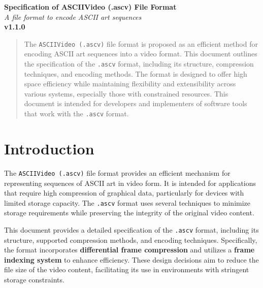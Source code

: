 \documentclass{article}
\begin{document}
\begin{titlepage}
   \begin{center}
       \vspace*{1cm}
       \textbf{Specification of ASCIIVideo (.ascv) File Format} \\
        \textit{A file format to encode ASCII art sequences} \\
        \vspace{0.5cm}
       \textbf{v1.1.0} \\
        \vspace{2cm}
       \vfill
   \end{center}
\end{titlepage}

\begin{abstract}
The \texttt{ASCIIVideo (.ascv)} file format is proposed as an efficient method for encoding ASCII art sequences into a video format. This document outlines the specification of the \texttt{.ascv} format, including its structure, compression techniques, and encoding methods. The format is designed to offer high space efficiency while maintaining flexibility and extensibility across various systems, especially those with constrained resources. This document is intended for developers and implementers of software tools that work with the \texttt{.ascv} format.
\end{abstract}
\newpage

\section{Introduction}

The \texttt{ASCIIVideo (.ascv)} file format provides an efficient mechanism for representing sequences of ASCII art \cite{enwiki:1271222132} in video form. It is intended for applications that require high compression of graphical data, particularly for devices with limited storage capacity. The \texttt{.ascv} format uses several techniques to minimize storage requirements while preserving the integrity of the original video content.

This document provides a detailed specification of the \texttt{.ascv} format, including its structure, supported compression methods, and encoding techniques. Specifically, the format incorporates \textbf{differential frame compression} \cite{Frame_Differencing} and utilizes a \textbf{frame indexing system} \cite{enwiki:1242251239} to enhance efficiency. These design decisions aim to reduce the file size of the video content, facilitating its use in environments with stringent storage constraints.
\end{document}

